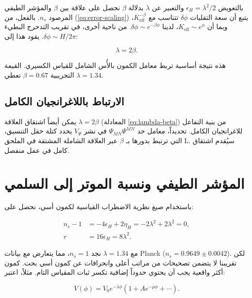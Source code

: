 \documentclass[12pt,a4paper]{article}
\newcommand{\Keff}{K_{\mathrm{eff}}}
\newcommand{\rs}{r}
\begin{document}
	بالتعويض \(\epsilon_H = \lambda^2/2\) والتعبير عن \(\lambda\) بدلالة \(\beta\) نحصل على علاقة بين \(\beta\) والمؤشر الطيفي المرصود \(n_s\). بالفعل، من (\ref{eq:error-scaling}) يتبع أن سعة التقلبات \(\delta \phi\) تتناسب مع \(\Keff^{-\beta}\)، وبما أن \(\Keff \sim e^{\phi}\)، لدينا \(\delta \phi \sim e^{-\beta \phi}\). من ناحية أخرى، في تقريب التدحرج البطيء \(\delta \phi \sim H/2\pi\). يقود هذا إلى:
	
	\begin{equation}
		\lambda = 2\beta.
		\label{eq:lambda-beta}
	\end{equation}
	
	هذه نتيجة أساسية تربط معامل الكمون بالأُس الشامل للقياس الكسيري. القيمة التجريبية \(\beta = 0.67\) تعطي \(\lambda = 1.34\).
	
	\subsection{الارتباط باللاغرانجيان الكامل}
	
	يمكن أيضاً اشتقاق العلاقة \(\lambda = 2\beta\) (المعادلة \ref{eq:lambda-beta}) من بنية التفاعل للاغرانجيان الكامل. تحديداً، معامل حد \(\Psi_{MN}\Psi^{MN}\) في نشر \(V_{\Psi}\) يحدد كتلة حقل التنسيق، التي ترتبط بدورها بـ \(\beta\) عبر العلاقة الشاملة المشتقة في الملحق L. سيُقدم اشتقاق كامل في عمل منفصل.
	
	\section{المؤشر الطيفي ونسبة الموتر إلى السلمي}
	\label{sec:predictions}
	
	باستخدام صيغ نظرية الاضطراب القياسية لكمون أسي، نحصل على:
	
	\begin{align}
		n_s - 1 &= -4\epsilon_H + 2\eta_H = -2\lambda^2 + 2\lambda^2 = 0, \label{eq:ns-temp}\\
		\rs &= 16\epsilon_H = 8\lambda^2. \label{eq:r-pred}
	\end{align}
	
	مع \(\lambda = 1.34\) نجد \(n_s = 1\)، مما يتعارض مع بيانات Planck (\(n_s = 0.9649 \pm 0.0042\)). لكن تقريبنا لا يتضمن تصحيحات من مراتب أعلى وانحرافات عن كمون أسي بحت. كمون أكثر واقعية يجب أن يحتوي حدوداً إضافية تكسر ثبات المقياس التام. مثلاً، اعتبر:
	
	\begin{equation}
		V(\phi) = V_0 e^{-\lambda \phi} \left(1 + A e^{-\mu \phi} + \cdots \right).
	\end{equation}
	
\end{document}
